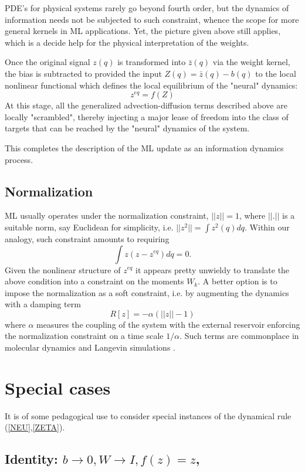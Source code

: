 \documentclass[15pt]{article}
\begin{document}
PDE's for physical systems rarely go beyond fourth order, but the 
dynamics of information needs not be subjected to such constraint, whence
the scope for more general kernels in ML applications.
Yet, the picture given above still applies, which is a
decide help for the physical interpretation of the weights. 

Once the original signal $z(q)$ is transformed into $\bar z(q)$ 
via the weight kernel, the bias is subtracted to provided the 
input $Z(q) = \bar z(q) - b(q)$ to the local nonlinear
functional which defines the local equilibrium
of the "neural" dynamics:
$$
z^{eq} = f(Z)
$$ 
At this stage, all the generalized advection-diffusion terms described above
are locally "scrambled", thereby injecting a major lease of freedom into 
the class of targets that can be reached by the "neural" dynamics of the system.   

This completes the description of the ML update as an 
information dynamics process. 

\subsection{Normalization}

ML usually operates under the normalization constraint,
$||z||=1$, where $||. ||$ is a suitable norm, say Euclidean 
for simplicity, i.e. $||z^2|| = \int z^2(q) dq$.  
Within our analogy, such constraint amounts to requiring 
$$\int z(z-z^{eq})dq=0.$$ 
Given the nonlinear structure of $z^{eq}$ it appears pretty unwieldy
to translate the above condition into a constraint on the moments $W_k$.
A better option is to impose the normalization as a 
soft constraint, i.e. by augmenting the dynamics with a damping term
$$
R[z] = -\alpha(||z||-1)
$$
where $\alpha$ measures the coupling of the system with the external
reservoir enforcing the normalization constraint on a time scale $1/\alpha$.
Such terms are commonplace in molecular dynamics and Langevin simulations 
\cite{FRENKEL,META}.

\section{Special cases}

It is of some pedagogical use to consider special instances of the
dynamical rule (\ref{NEU},\ref{ZETA}).

\subsection{Identity: $b \to 0, W \to I, f(z)=z$,} 
\end{document}
